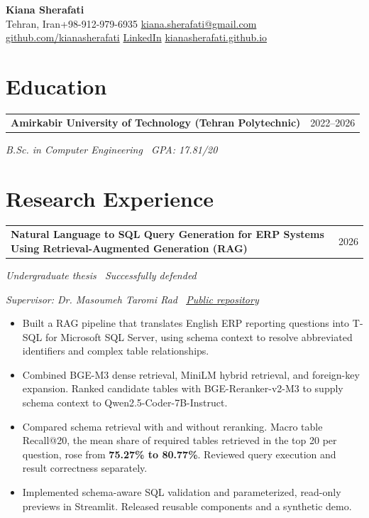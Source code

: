 \documentclass[a4paper,11pt]{article}
\makeatletter
\newcommand{\entry}[2]{%
  \begin{tabularx}{\linewidth}{@{}X@{\hspace{0.8em}}r@{}}%
  \textbf{#1} & {\small #2}\\%
  \end{tabularx}\par}
\newcommand{\detail}[1]{{\small\textit{#1}}\par}
\makeatother
\begin{document}
\begin{center}
  {\LARGE\bfseries Kiana Sherafati}\\[5pt]
  {\small Tehran, Iran\enspace\textbar\enspace +98-912-979-6935
    \enspace\textbar\enspace
    \href{mailto:kiana.sherafati@gmail.com}{kiana.sherafati@gmail.com}}\\[3pt]
  {\small
    \href{https://github.com/kianasherafati}{github.com/kianasherafati}
    \enspace\textbar\enspace
    \href{https://www.linkedin.com/in/kiana-sherafati-23b424323/}{LinkedIn}
    \enspace\textbar\enspace
    \href{https://kianasherafati.github.io}{kianasherafati.github.io}}
\end{center}
\vspace{-7pt}

\section{Education}
\entry{Amirkabir University of Technology (Tehran Polytechnic)}{2022--2026}
\detail{B.Sc. in Computer Engineering \textbar\ GPA: 17.81/20}

\section{Research Experience}
\entry{Natural Language to SQL Query Generation for ERP Systems\newline
  Using Retrieval-Augmented Generation (RAG)}{2026}
\detail{Undergraduate thesis \textbar\ Successfully defended}
\detail{Supervisor: Dr. Masoumeh Taromi Rad \textbar\
  \href{https://github.com/kianasherafati/erp-text2sql-rag-portfolio}{Public repository}}
\begin{itemize}
  \item Built a RAG pipeline that translates English ERP reporting questions
    into T-SQL for Microsoft SQL Server, using schema context to resolve
    abbreviated identifiers and complex table relationships.
  \item Combined BGE-M3 dense retrieval, MiniLM hybrid retrieval, and
    foreign-key expansion. Ranked candidate tables with BGE-Reranker-v2-M3
    to supply schema context to Qwen2.5-Coder-7B-Instruct.
  \item Compared schema retrieval with and without reranking. Macro table
    Recall@20, the mean share of required tables retrieved in the top 20
    per question, rose from \textbf{75.27\% to 80.77\%}. Reviewed query
    execution and result correctness separately.
  \item Implemented schema-aware SQL validation and parameterized, read-only
    previews in Streamlit. Released reusable components and a synthetic demo.
\end{itemize}
\end{document}
